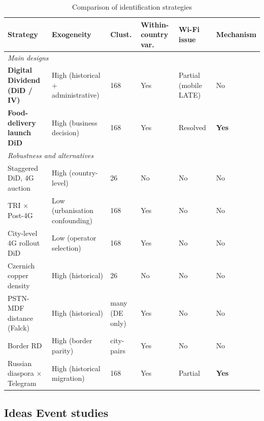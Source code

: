 \documentclass[12pt, a4paper]{article}
\begin{document}
\begin{table}[H]
\centering
\footnotesize
\caption{Comparison of identification strategies}
\label{tab:identification_strategies}
\begin{tabular}{p{4.2cm} p{2.6cm} p{0.9cm} p{1.6cm} p{1.3cm} p{1.8cm}}
\hline\hline
\textbf{Strategy} & \textbf{Exogeneity} & \textbf{Clust.} & \textbf{Within-country var.} & \textbf{Wi-Fi issue} & \textbf{Mechanism} \\
\hline
\multicolumn{6}{l}{\textit{Main designs}} \\[3pt]

\textbf{Digital Dividend (DiD / IV)} & 
High (historical + administrative) & 
168 & 
Yes & 
Partial (mobile LATE) & 
No \\[4pt]

\textbf{Food-delivery launch DiD} & 
High (business decision) & 
168 & 
Yes & 
Resolved & 
\textbf{Yes} \\[6pt]

\hline
\multicolumn{6}{l}{\textit{Robustness and alternatives}} \\[3pt]

Staggered DiD, 4G auction & 
High (country-level) & 
26 & 
No & 
No & 
No \\[4pt]

TRI $\times$ Post-4G & 
Low (urbanisation confounding) & 
168 & 
Yes & 
No & 
No \\[4pt]

City-level 4G rollout DiD & 
Low (operator selection) & 
168 & 
Yes & 
No & 
No \\[4pt]

Czernich copper density & 
High (historical) & 
26 & 
No & 
No & 
No \\[4pt]

PSTN-MDF distance (Falck) & 
High (historical) & 
many (DE only) & 
Yes & 
No & 
No \\[4pt]

Border RD & 
High (border parity) & 
city-pairs & 
Yes & 
No & 
No \\[4pt]

Russian diaspora $\times$ Telegram & 
High (historical migration) & 
168 & 
Yes & 
Partial & 
\textbf{Yes} \\[3pt]

\hline\hline
\end{tabular}
\end{table}

\newpage
\subsection{Ideas Event studies}
\end{document}
